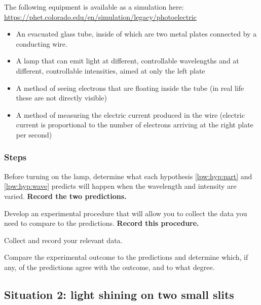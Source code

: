 The following equipment is available as a simulation here: \url{https://phet.colorado.edu/en/simulation/legacy/photoelectric}

\begin{itemize}
	\item An evacuated glass tube, inside of which are two metal plates connected by a conducting wire.
	
	\item A lamp that can emit light at different, controllable wavelengths and at different, controllable intensities, aimed at only the left plate
	
	\item A method of seeing electrons that are floating inside the tube (in real life these are not directly visible)
	
	\item A method of measuring the electric current produced in the wire (electric current is proportional to the number of electrons arriving at the right plate per second)
\end{itemize}

\subsubsection{Steps}

\begin{steps}
	
	\item Before turning on the lamp, determine what each hypothesis \ref{lpw:hyp:part} and \ref{lpw:hyp:wave} predicts will happen when the wavelength and intensity are varied. \textbf{Record the two predictions.}
	
	\item Develop an experimental procedure that will allow you to collect the data you need to compare to the predictions. \textbf{Record this procedure.}
	
	\item Collect and record your relevant data.
	
	\item Compare the experimental outcome to the predictions and determine which, if any, of the predictions agree with the outcome, and to what degree.
\end{steps}


\subsection{Situation 2: light shining on two small slits}


